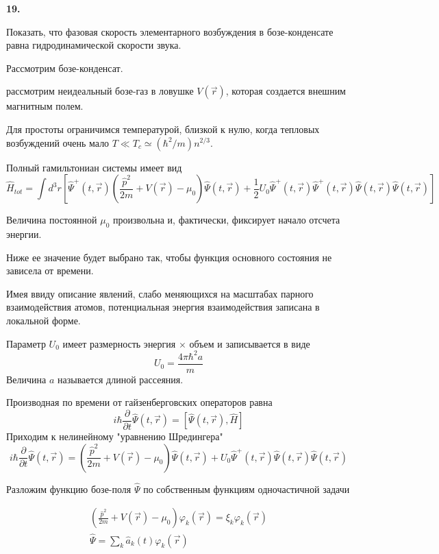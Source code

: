 \documentclass[a4paper,12pt]{article} %
\begin{document}
\begin{ttask} \textbf{19.}
	 
Показать, что фазовая скорость элементарного возбуждения в бозе-конденсате равна гидродинамической скорости звука.



Рассмотрим бозе-конденсат.





рассмотрим неидеальный бозе-газ в ловушке $V(\vec{r})$, которая создается внешним магнитным полем. 

Для простоты ограничимся температурой, близкой к нулю, 
когда тепловых возбуждений очень мало 
$T \ll T_{c} \simeq\left(\hbar^{2} / m\right) n^{2 / 3}$. 

Полный гамильтониан системы имеет вид
$$
\hat{H}_{t o t}
=
\int d^{3} r\left[
\hat{\Psi}^{+}(t, \vec{r})
\left(\frac{\hat{p}^{2}}{2 m}+V(\vec{r})-\mu_{0}\right) 
\hat{\Psi}(t, \vec{r})
+
\frac{1}{2} U_{0} 
\hat{\Psi}^{+}(t, \vec{r}) \hat{\Psi}^{+}(t, \vec{r}) 
\hat{\Psi}(t, \vec{r}) \hat{\Psi}(t, \vec{r})
\right]
$$


Величина постоянной $\mu_{0}$ произвольна и, фактически, фиксирует начало отсчета энергии. 

Ниже ее значение будет выбрано так, чтобы функция основного состояния не зависела от времени. 

Имея ввиду описание явлений, слабо меняющихся на масштабах парного взаимодействия атомов, 
потенциальная энергия взаимодействия записана в локальной форме. 


Параметр $U_{0}$ имеет размерность энергия $\times$ объем и записывается в виде
$$
U_{0}=\frac{4 \pi \hbar^{2} a}{m}
$$
Величина $a$ называется длиной рассеяния. 



Производная по времени от гайзенберговских операторов равна
$$
i \hbar \frac{\partial}{\partial t} \hat{\Psi}(t, \vec{r})=[\hat{\Psi}(t, \vec{r}), \hat{H}]
$$
Приходим к нелинейному "уравнению Шредингера"
$$
i \hbar \frac{\partial}{\partial t} 
\hat{\Psi}(t, \vec{r})
=
\left(\frac{\hat{p}^{2}}{2 m}+V(\vec{r})-\mu_{0}\right) 
\hat{\Psi}(t, \vec{r})
+
U_{0} 
\hat{\Psi}^{+}(t, \vec{r}) 
\hat{\Psi}(t, \vec{r}) \hat{\Psi}(t, \vec{r})
$$



Разложим функцию бозе-поля $\hat{\Psi}$ 
по собственным функциям одночастичной задачи


\[ 
\begin{array}{c}
	\left(\frac{\hat{p}^{2}}{2 m}+V(\vec{r})-\mu_{0}\right) \varphi_{k}(\vec{r})=\xi_{k} \varphi_{k}(\vec{r}) \\
	\hat{\Psi}=\sum_{k} \hat{a}_{k}(t) \varphi_{k}(\vec{r})
\end{array} 
\]




\end{ttask}
\end{document}
